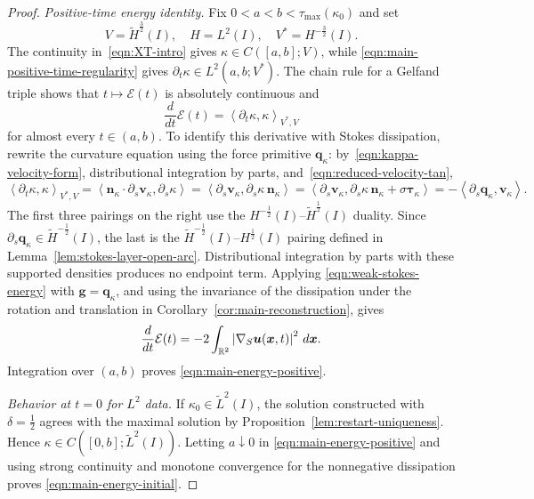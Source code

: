 \documentclass[11pt,reqno]{amsart}
\theoremstyle{plain}
\theoremstyle{definition}
\numberwithin{equation}{section}
\newcommand{\p}{\partial}
\newcommand{\grad}[1]{\nabla #1}
\newcommand{\mc}[1]{\mathcal{#1}}
\newcommand{\wt}[1]{\widetilde{#1}}
\newcommand{\bm}[1]{\boldsymbol{#1}}
\newcommand{\abs}[1]{\left\lvert #1 \right\rvert}
\newcommand{\dual}[2]{\left\langle #1,#2 \right\rangle}
\newcommand{\R}{\mathbb{R}}
\newcommand{\tk}{\bm\tau_\kappa}
\newcommand{\nk}{\bm n_\kappa}
\newcommand{\thi}[1]{\wt H^{#1}(I)}
\begin{document}
\begin{proof}
\emph{Positive-time energy identity.}
Fix $0<a<b<\tau_{\mathrm{max}}(\kappa_0)$ and set
\begin{equation}
    V=\thi{\frac32},\quad H=L^2(I),\quad
    V^*=H^{-\frac32}(I).
\end{equation}
The continuity in~\eqref{eqn:XT-intro} gives $\kappa\in C([a,b];V)$, while
\eqref{eqn:main-positive-time-regularity} gives $\p_t\kappa\in L^2(a,b;V^*)$. The chain rule for a Gelfand triple shows
that $t\mapsto\mc E(t)$ is absolutely continuous and
\begin{equation}
    \frac{d}{dt}\mc E(t)
    =
    \dual{\p_t\kappa}{\kappa}_{V^*,V}
\end{equation}
for almost every $t\in(a,b)$. To identify this derivative with Stokes
dissipation, rewrite the curvature equation using the force primitive
$\bm q_\kappa$: by~\eqref{eqn:kappa-velocity-form}, distributional
integration by parts, and~\eqref{eqn:reduced-velocity-tan},
\begin{equation}\label{eqn:weak-curvature-energy}
    \dual{\p_t\kappa}{\kappa}_{V^*,V} = \dual{\nk\cdot\p_s\bm v_\kappa}{\p_s\kappa} =\dual{\p_s\bm
    v_\kappa}{\p_s\kappa\,\nk} = \dual{\p_s\bm v_\kappa} {\p_s\kappa\,\nk+\sigma\tk} =-\dual{\p_s \bm q_\kappa}{\bm
    v_\kappa}.
\end{equation}
The first three pairings on the right use the
$H^{-\frac12}(I)$--$\wt H^{\frac12}(I)$ duality. Since
$\p_s \bm q_\kappa\in\wt H^{-\frac12}(I)$, the last is the
$\wt H^{-\frac12}(I)$--$H^{\frac12}(I)$ pairing defined in
Lemma~\ref{lem:stokes-layer-open-arc}. Distributional integration by
parts with these supported densities produces no endpoint term. Applying
\eqref{eqn:weak-stokes-energy} with $\bm g=\bm q_\kappa$, and using the invariance
of the dissipation under the rotation and translation in
Corollary~\ref{cor:main-reconstruction}, gives
\begin{equation}
    \frac{d}{dt}\mc E(t)
    =
    -2\int_{\R^2}\abs{\grad_S\bm u(\bm x,t)}^2\,d\bm x.
\end{equation}
Integration over $(a,b)$ proves \eqref{eqn:main-energy-positive}.

\emph{Behavior at $t=0$ for $L^2$ data.}
If $\kappa_0\in\wt L^2(I)$, the solution constructed with
$\delta=\frac12$ agrees with the maximal solution by
Proposition~\ref{lem:restart-uniqueness}. Hence
$\kappa\in C([0,b];\wt L^2(I))$. Letting $a\downarrow0$ in
\eqref{eqn:main-energy-positive} and using strong continuity and monotone
convergence for the nonnegative dissipation proves
\eqref{eqn:main-energy-initial}.


\end{proof}
\end{document}
